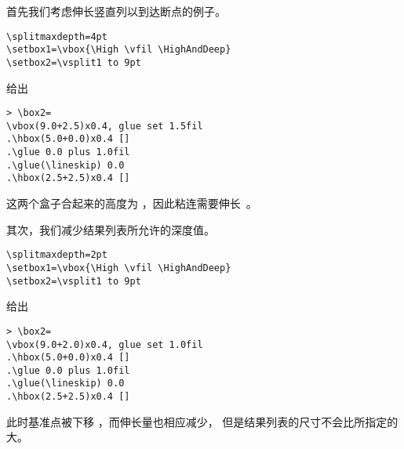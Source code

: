 \documentclass{book}
\begin{document}
首先我们考虑伸长竖直列以到达断点的例子。 
\begin{verbatim}
\splitmaxdepth=4pt 
\setbox1=\vbox{\High \vfil \HighAndDeep}
\setbox2=\vsplit1 to 9pt
\end{verbatim}
给出
\begin{verbatim}
> \box2=
\vbox(9.0+2.5)x0.4, glue set 1.5fil
.\hbox(5.0+0.0)x0.4 []
.\glue 0.0 plus 1.0fil
.\glue(\lineskip) 0.0
.\hbox(2.5+2.5)x0.4 []
\end{verbatim}
这两个盒子合起来的高度为 \n{7.5pt}，因此粘连需要伸长~\n{1.5pt}。

其次，我们减少结果列表所允许的深度值。
\begin{verbatim}
\splitmaxdepth=2pt 
\setbox1=\vbox{\High \vfil \HighAndDeep}
\setbox2=\vsplit1 to 9pt
\end{verbatim}
给出
\begin{verbatim}
> \box2=
\vbox(9.0+2.0)x0.4, glue set 1.0fil
.\hbox(5.0+0.0)x0.4 []
.\glue 0.0 plus 1.0fil
.\glue(\lineskip) 0.0
.\hbox(2.5+2.5)x0.4 []
\end{verbatim}
此时基准点被下移 \n{0.5pt}，而伸长量也相应减少，
\alt
但是结果列表的尺寸不会比所指定的大。
\end{document}
